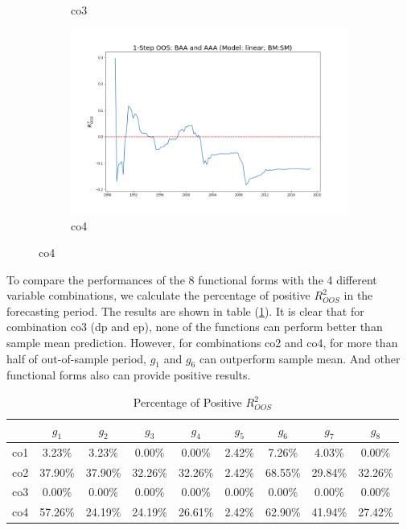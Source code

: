 \documentclass[a4paper,12pt,times,numbered,print,index]{report}
\numberwithin{equation}{section}
\begin{document}
\begin{figure}[!htbp]
\begin{subfigure}[b]{0.42\linewidth}
			\caption{co3}
		\end{subfigure}
		\begin{subfigure}[b]{0.42\linewidth}
			\includegraphics[width=0.9\linewidth]{OOS_plots/linear_co4_SM.png}
			\caption{co4}
		\end{subfigure}
		\label{g8}
	\end{figure}
	\pagebreak
	
	To compare the performances of the 8 functional forms with the 4 different variable combinations, we calculate the percentage of positive $R^2_{OOS}$ in the forecasting period. The results are shown in table (\ref{perct}). It is clear that for combination co3 (dp and ep), none of the functions can perform better than sample mean prediction. However, for combinations co2 and co4, for more than half of out-of-sample period, $g_1$ and $g_6$ can outperform sample mean. And other functional forms also can provide positive results. 
	
	\begin{table}[htbp]
		\centering
		\caption{Percentage of Positive $R^2_{OOS}$}
		\begin{tabular}{ccccccccc}
			\toprule
			& $g_1$    & $g_2$    & $g_3$    & $g_4$    & $g_5$    & $g_6$    & $g_7$    & $g_8$ \\
			\midrule
			co1   & 3.23\% & 3.23\% & 0.00\% & 0.00\% & 2.42\% & 7.26\% & 4.03\% & 0.00\% \\
			co2   & 37.90\% & 37.90\% & 32.26\% & 32.26\% & 2.42\% & \textcolor[rgb]{ .753,  0,  0}{68.55\%} & 29.84\% & 32.26\% \\
			co3   & 0.00\% & 0.00\% & 0.00\% & 0.00\% & 0.00\% & 0.00\% & 0.00\% & 0.00\% \\
			co4   & \textcolor[rgb]{ .753,  0,  0}{57.26\%} & 24.19\% & 24.19\% & 26.61\% & 2.42\% & \textcolor[rgb]{ .753,  0,  0}{62.90\%} & 41.94\% & 27.42\% \\
			\bottomrule
			\bottomrule
		\end{tabular}%
		\label{perct}%
	\end{table}%
	
\end{document}
